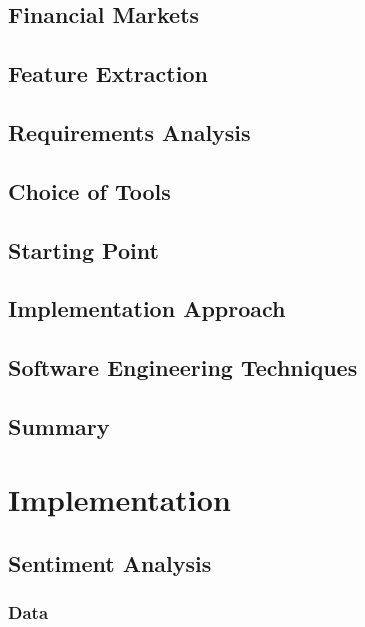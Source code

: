 \documentclass[12pt,a4paper,twoside,openright]{report}
\begin{document}
\section{Financial Markets}
\label{sec:introFin}

\section{Feature Extraction}
\label{sec:introFeat}

\section{Requirements Analysis}
\label{sec:introReq}


\section{Choice of Tools}
\label{sec:introTool}


\section{Starting Point}
\label{sec:introStart}


\section{Implementation Approach}
\label{sec:introImpl}


\section{Software Engineering Techniques}
\label{sec:introSoft}


\section{Summary}
\label{sec:introSumm}


\chapter{Implementation}

\section{Sentiment Analysis}

\subsection{Data}
\end{document}
